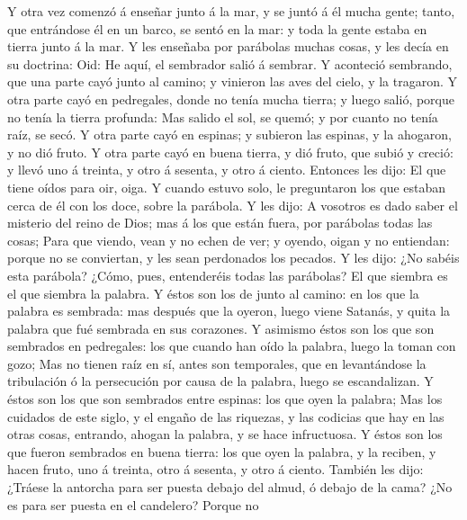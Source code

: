  Y otra vez comenzó á enseñar junto á la mar, y se juntó á
él mucha gente; tanto, que entrándose él en un barco, se sentó en la
mar: y toda la gente estaba en tierra junto á la mar.  Y
les enseñaba por parábolas muchas cosas, y les decía en su doctrina:
 Oid: He aquí, el sembrador salió á sembrar.
 Y aconteció sembrando, que una parte cayó junto al
camino; y vinieron las aves del cielo, y la tragaron.  Y
otra parte cayó en pedregales, donde no tenía mucha tierra; y luego
salió, porque no tenía la tierra profunda:  Mas salido el
sol, se quemó; y por cuanto no tenía raíz, se secó.  Y
otra parte cayó en espinas; y subieron las espinas, y la ahogaron, y no
dió fruto.  Y otra parte cayó en buena tierra, y dió
fruto, que subió y creció: y llevó uno á treinta, y otro á sesenta, y
otro á ciento.  Entonces les dijo: El que tiene oídos para
oir, oiga.  Y cuando estuvo solo, le preguntaron los que
estaban cerca de él con los doce, sobre la parábola.  Y
les dijo: A vosotros es dado saber el misterio del reino de Dios; mas á
los que están fuera, por parábolas todas las cosas;  Para
que viendo, vean y no echen de ver; y oyendo, oigan y no entiendan:
porque no se conviertan, y les sean perdonados los pecados.
 Y les dijo: ¿No sabéis esta parábola? ¿Cómo, pues,
entenderéis todas las parábolas?  El que siembra es el
que siembra la palabra.  Y éstos son los de junto al
camino: en los que la palabra es sembrada: mas después que la oyeron,
luego viene Satanás, y quita la palabra que fué sembrada en sus
corazones.  Y asimismo éstos son los que son sembrados en
pedregales: los que cuando han oído la palabra, luego la toman con gozo;
 Mas no tienen raíz en sí, antes son temporales, que en
levantándose la tribulación ó la persecución por causa de la palabra,
luego se escandalizan.  Y éstos son los que son sembrados
entre espinas: los que oyen la palabra;  Mas los cuidados
de este siglo, y el engaño de las riquezas, y las codicias que hay en
las otras cosas, entrando, ahogan la palabra, y se hace infructuosa.
 Y éstos son los que fueron sembrados en buena tierra:
los que oyen la palabra, y la reciben, y hacen fruto, uno á treinta,
otro á sesenta, y otro á ciento.  También les dijo:
¿Tráese la antorcha para ser puesta debajo del almud, ó debajo de la
cama? ¿No es para ser puesta en el candelero?  Porque no
